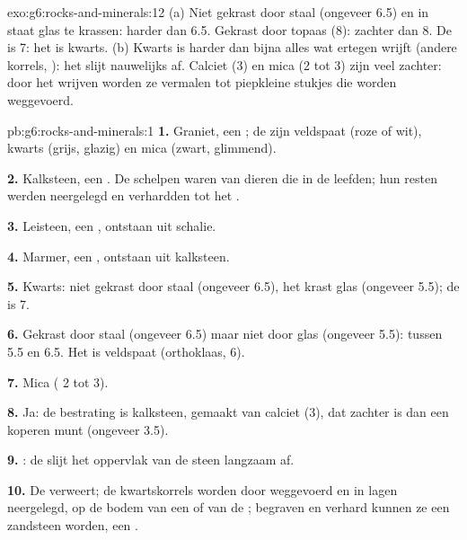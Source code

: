 \begin{solution}{exo:g6:rocks-and-minerals:12}
(a) Niet gekrast door staal (ongeveer 6.5) en in staat glas te krassen:
harder dan 6.5. Gekrast door topaas (8): zachter dan 8. De  is 7:
het is kwarts. (b) Kwarts is harder dan bijna alles wat ertegen wrijft
(andere korrels, ): het slijt nauwelijks af. Calciet (3) en mica
(2 tot 3) zijn veel zachter: door het wrijven worden ze vermalen tot
piepkleine stukjes die worden weggevoerd.
\end{solution}

\begin{solution}{pb:g6:rocks-and-minerals:1}
\textbf{1.} Graniet, een ; de  zijn veldspaat
(roze of wit), kwarts (grijs, glazig) en mica (zwart, glimmend).

\textbf{2.} Kalksteen, een . De schelpen waren van
dieren die in de  leefden; hun resten werden neergelegd en verhardden
tot het .

\textbf{3.} Leisteen, een , ontstaan uit schalie.

\textbf{4.} Marmer, een , ontstaan uit kalksteen.

\textbf{5.} Kwarts: niet gekrast door staal (ongeveer 6.5), het krast glas
(ongeveer 5.5); de  is 7.

\textbf{6.} Gekrast door staal (ongeveer 6.5) maar niet door glas
(ongeveer 5.5): tussen 5.5 en 6.5. Het is veldspaat (orthoklaas, 6).

\textbf{7.} Mica ( 2 tot 3).

\textbf{8.} Ja: de bestrating is kalksteen, gemaakt van calciet (3), dat
zachter is dan een koperen munt (ongeveer 3.5).

\textbf{9.} : de  slijt het oppervlak van de steen langzaam
af.

\textbf{10.} De  verweert; de kwartskorrels worden door 
weggevoerd en in lagen neergelegd, op de bodem van een  of van de ;
begraven en verhard kunnen ze een zandsteen worden, een
.


\end{solution}

